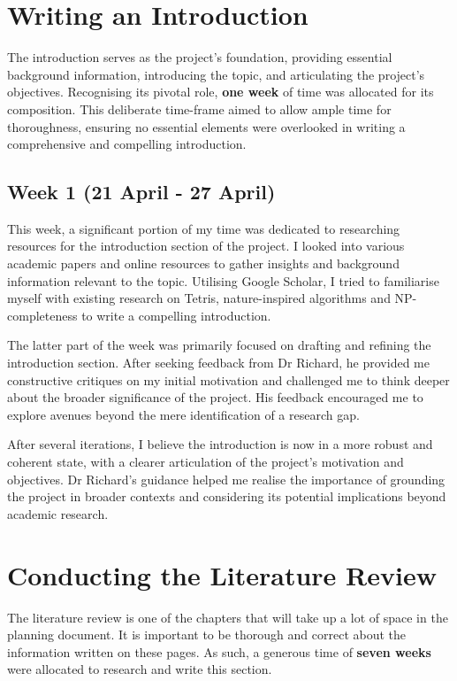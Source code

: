 \documentclass[a4paper, 12pt]{extreport}
\begin{document}
		\section{Writing an Introduction}
		\label{sec:intro}
		
			The introduction serves as the project's foundation, providing essential background information, introducing the topic, and articulating the project's objectives. Recognising its pivotal role, \textbf{one week} of time was allocated for its composition. This deliberate time-frame aimed to allow ample time for thoroughness, ensuring no essential elements were overlooked in writing a comprehensive and compelling introduction.
			
			\subsection{Week 1 (21 April - 27 April)}
				
				This week, a significant portion of my time was dedicated to researching resources for the introduction section of the project. I looked into various academic papers and online resources to gather insights and background information relevant to the topic. Utilising Google Scholar, I tried to familiarise myself with existing research on Tetris, nature-inspired algorithms and NP-completeness to write a compelling introduction.
				
				The latter part of the week was primarily focused on drafting and refining the introduction section. After seeking feedback from Dr Richard, he provided me constructive critiques on my initial motivation and challenged me to think deeper about the broader significance of the project. His feedback encouraged me to explore avenues beyond the mere identification of a research gap.
				
				After several iterations, I believe the introduction is now in a more robust and coherent state, with a clearer articulation of the project's motivation and objectives. Dr Richard's guidance helped me realise the importance of grounding the project in broader contexts and considering its potential implications beyond academic research.				
				
		\section{Conducting the Literature Review}
		\label{sec:litrev}
		
			The literature review is one of the chapters that will take up a lot of space in the planning document. It is important to be thorough and correct about the information written on these pages. As such, a generous time of \textbf{seven weeks} were allocated to research and write this section.
		
\end{document}
